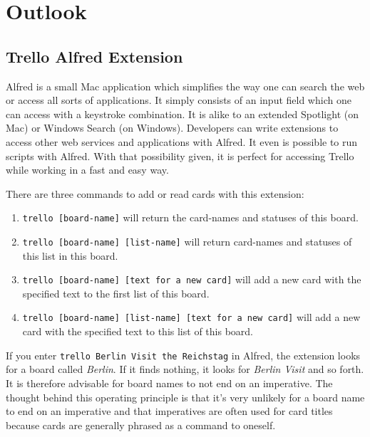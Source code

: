 \onehalfspacing
\chapter{Outlook}
  \label{Outlook}

\section{Trello Alfred Extension}

Alfred  is a small Mac application which simplifies the way one can search the web or access all sorts of applications. It simply consists of an input field which one can access with a keystroke combination. It is alike to an extended Spotlight (on Mac) or Windows Search (on Windows). Developers can write extensions to access other web services and applications with Alfred. It even is possible to run scripts with Alfred. With that possibility given, it is perfect for accessing Trello while working in a fast and easy way. \cite{alfred}



There are three commands to add or read cards with this extension:

\begin{enumerate}
	\item \texttt{trello [board-name]} will return the card-names and statuses of this board.
	\item \texttt{trello [board-name] [list-name]} will return card-names and statuses of this list in this board.
	\item \texttt{trello [board-name] [text for a new card]} will add a new card with the specified text to the first list of this board.
	\item \texttt{trello [board-name] [list-name] [text for a new card]} will add a new card with the specified text to this list of this board.
\end{enumerate}

If you enter \texttt{trello Berlin Visit the Reichstag} in Alfred, the extension looks for a board called \emph{Berlin}. If it finds nothing, it looks for \emph{Berlin Visit} and so forth. It is therefore advisable for board names to not end on an imperative. The thought behind this operating principle is that it's very unlikely for a board name to end on an imperative and that imperatives are often used for card titles because cards are generally phrased as a command to oneself.

